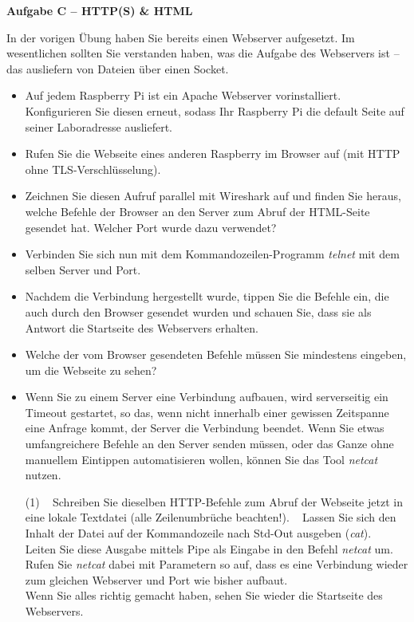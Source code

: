 \documentclass[paper=a4,fontsize=11pt]{scrartcl}%
\numberwithin{equation}{section}
\begin{document}
\begin{center}\Large{\textbf{Aufgabe C -- HTTP(S) \& HTML}}\end{center}\vskip0.25in
In der vorigen Übung haben Sie bereits einen Webserver aufgesetzt. Im wesentlichen sollten Sie verstanden haben, was die Aufgabe des Webservers ist -- das ausliefern von Dateien über einen Socket.
\begin{itemize}
	\item Auf jedem Raspberry Pi ist ein Apache Webserver vorinstalliert. Konfigurieren Sie diesen erneut, sodass Ihr Raspberry Pi die default Seite auf seiner Laboradresse ausliefert.
	\item Rufen Sie die Webseite eines anderen Raspberry im Browser auf (mit HTTP ohne TLS-Verschlüsselung).
	\item Zeichnen Sie diesen Aufruf parallel mit Wireshark auf und finden Sie heraus, welche Befehle der Browser an den Server zum  Abruf der HTML-Seite gesendet hat. Welcher Port wurde dazu verwendet?
	\item Verbinden Sie sich nun mit dem Kommandozeilen-Programm \emph{telnet} mit dem selben Server und Port.
	\item Nachdem die Verbindung hergestellt wurde, tippen Sie die Befehle ein, die auch durch den Browser gesendet wurden und schauen Sie, dass sie als Antwort die Startseite des Webservers erhalten.
	\item  Welche der vom Browser gesendeten Befehle müssen Sie mindestens eingeben, um die Webseite zu sehen?
	\item Wenn Sie zu einem Server eine Verbindung aufbauen, wird serverseitig ein Timeout gestartet, so das, wenn nicht innerhalb einer gewissen Zeitspanne eine Anfrage kommt, der Server die Verbindung beendet. Wenn Sie etwas umfangreichere Befehle an den Server senden müssen, oder das Ganze ohne manuellem Eintippen automatisieren wollen, können Sie das Tool \emph{netcat} nutzen.
	\begin{tasks}(1)
		\task~ Schreiben Sie dieselben HTTP-Befehle zum Abruf der Webseite jetzt in eine lokale Textdatei (alle Zeilenumbrüche beachten!).
		\task~ Lassen Sie sich den Inhalt der Datei auf der Kommandozeile nach Std-Out ausgeben (\emph{cat}).
		\task~ Leiten Sie diese Ausgabe mittels Pipe als Eingabe in den Befehl \emph{netcat} um. Rufen Sie \emph{netcat} dabei mit  Parametern so auf, dass es eine Verbindung wieder zum gleichen Webserver und Port wie bisher aufbaut.\\
 Wenn Sie alles richtig gemacht haben, sehen Sie wieder die Startseite des Webservers. 

\end{tasks}
\end{itemize}
\end{document}
